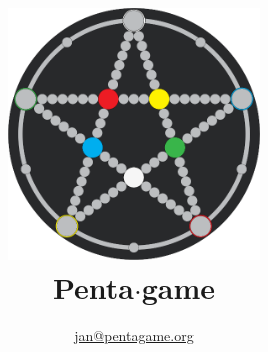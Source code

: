 \documentclass[DIV=33,landscape,paper=a3,12pt]{scrartcl}
\title{
\includegraphics[width=0.5\textwidth]{Pentagame_board_2018.png}\\
Penta$\cdot$game}
\author{ \href{mailto:jan@pentagame.org}{\makeatletter jan@pentagame.org\makeatother} }
\date{}
\begin{document}

\begin{framed}
\centering
{}
\end{framed}

\begin{multicols}{5}

\setlength{\columnseprule}{0.4pt}

\centering

    

\end{multicols}
\end{document}
